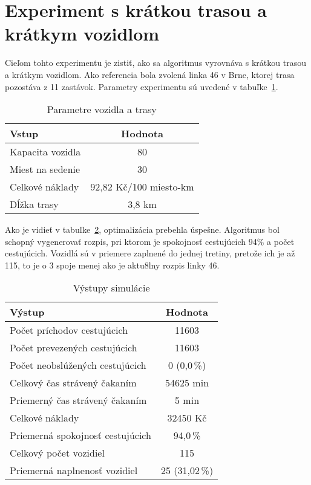 \newpage
\section{Experiment s krátkou trasou a krátkym vozidlom}
Cieľom tohto experimentu je zistiť, ako sa algoritmus vyrovnáva s krátkou trasou a krátkym vozidlom.
Ako referencia bola zvolená linka 46 v Brne, ktorej trasa pozostáva z 11 zastávok.
Parametry experimentu sú uvedené v tabuľke~\ref{tab:shortDshortVin}.

\begin{table}[h]
  \centering
  \begin{tabular}{|l|c|}
    \hline
    \textbf{Vstup} & \textbf{Hodnota} \\ \hline
    Kapacita vozidla & 80 \\ \hline
    Miest na sedenie & 30 \\ \hline
    Celkové náklady & 92,82 Kč/100 miesto-km \\ \hline
    Dĺžka trasy & 3,8 km \\ \hline
  \end{tabular}
  \caption{Parametre vozidla a trasy}
  \label{tab:shortDshortVin}
\end{table}

Ako je vidieť v tabuľke~\ref{tab:shortDshortVout}, optimalizácia prebehla úspešne.
Algoritmus bol schopný vygenerovať rozpis, pri ktorom je spokojnosť cestujúcich 94\% a počet cestujúcich.
Vozidlá sú v priemere zaplnené do jednej tretiny, pretože ich je až 115, to je o 3 spoje menej ako je aktu8lny rozpis linky 46.

\begin{table}[h]
  \centering
  \begin{tabular}{|l|c|}
    \hline
      \textbf{Výstup} & \textbf{Hodnota} \\ \hline
      Počet príchodov cestujúcich & 11603 \\ \hline
      Počet prevezených cestujúcich & 11603 \\ \hline
      Počet neobslúžených cestujúcich & 0 (0,0\,\%) \\ \hline
      Celkový čas strávený čakaním & 54625 min \\ \hline
      Priemerný čas strávený čakaním & 5 min \\ \hline
      Celkové náklady & 32450 Kč \\ \hline
      Priemerná spokojnosť cestujúcich & 94,0\,\% \\ \hline
      Celkový počet vozidiel & 115 \\ \hline
      Priemerná naplnenosť vozidiel & 25 (31,02\,\%) \\ \hline
  \end{tabular}
  \caption{Výstupy simulácie}
  \label{tab:shortDshortVout}
\end{table}

